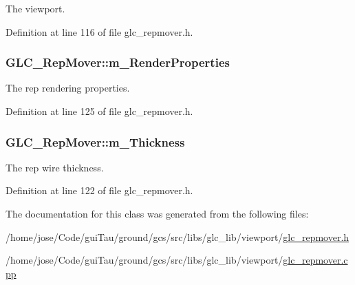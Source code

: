 The viewport. 



Definition at line 116 of file glc\-\_\-repmover.\-h.

\hypertarget{class_g_l_c___rep_mover_a9c639a1544ae2867646850aca74780d0}{
\subsubsection[{m\-\_\-\-Render\-Properties}]{ G\-L\-C\-\_\-\-Rep\-Mover\-::m\-\_\-\-Render\-Properties\hspace{0.3cm}{\ttfamily [protected]}}}\label{class_g_l_c___rep_mover_a9c639a1544ae2867646850aca74780d0}


The rep rendering properties. 



Definition at line 125 of file glc\-\_\-repmover.\-h.

\hypertarget{class_g_l_c___rep_mover_a8c836e61a72338cb4cfd2d7aa198996d}{
\subsubsection[{m\-\_\-\-Thickness}]{ G\-L\-C\-\_\-\-Rep\-Mover\-::m\-\_\-\-Thickness\hspace{0.3cm}{\ttfamily [protected]}}}\label{class_g_l_c___rep_mover_a8c836e61a72338cb4cfd2d7aa198996d}


The rep wire thickness. 



Definition at line 122 of file glc\-\_\-repmover.\-h.



The documentation for this class was generated from the following files\-:\begin{DoxyCompactItemize}
\item 
/home/jose/\-Code/gui\-Tau/ground/gcs/src/libs/glc\-\_\-lib/viewport/\hyperlink{glc__repmover_8h}{glc\-\_\-repmover.\-h}\item 
/home/jose/\-Code/gui\-Tau/ground/gcs/src/libs/glc\-\_\-lib/viewport/\hyperlink{glc__repmover_8cpp}{glc\-\_\-repmover.\-cpp}\end{DoxyCompactItemize}
